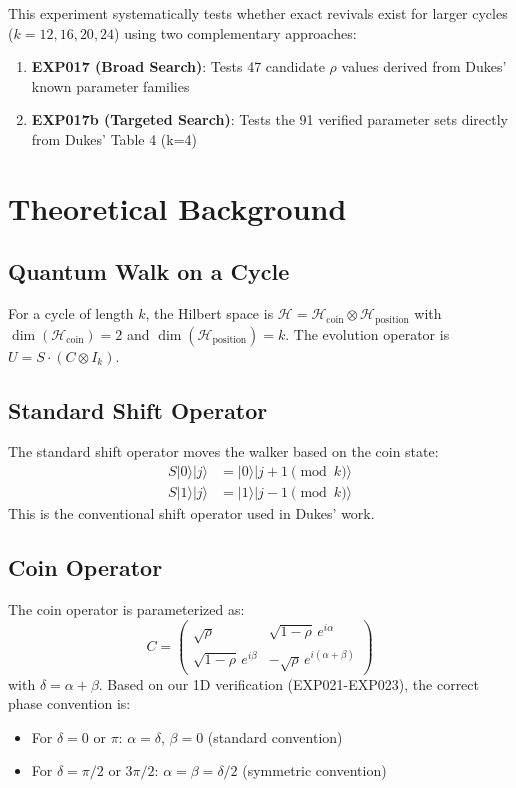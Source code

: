 \documentclass[12pt]{article}
\begin{document}
This experiment systematically tests whether exact revivals exist for larger cycles ($k = 12, 16, 20, 24$) using two complementary approaches:

\begin{enumerate}
    \item \textbf{EXP017 (Broad Search)}: Tests 47 candidate $\rho$ values derived from Dukes' known parameter families
    \item \textbf{EXP017b (Targeted Search)}: Tests the 91 verified parameter sets directly from Dukes' Table 4 (k=4)
\end{enumerate}

\section{Theoretical Background}

\subsection{Quantum Walk on a Cycle}

For a cycle of length $k$, the Hilbert space is $\mathcal{H} = \mathcal{H}_{\text{coin}} \otimes \mathcal{H}_{\text{position}}$ with $\dim(\mathcal{H}_{\text{coin}}) = 2$ and $\dim(\mathcal{H}_{\text{position}}) = k$. The evolution operator is $U = S \cdot (C \otimes I_k)$.

\subsection{Standard Shift Operator}

The standard shift operator moves the walker based on the coin state:
\begin{align}
S|0\rangle|j\rangle &= |0\rangle|j+1 \pmod k\rangle \\
S|1\rangle|j\rangle &= |1\rangle|j-1 \pmod k\rangle
\end{align}
This is the conventional shift operator used in Dukes' work.

\subsection{Coin Operator}

The coin operator is parameterized as:
\[
C = \begin{pmatrix}
\sqrt{\rho} & \sqrt{1-\rho}\, e^{i\alpha} \\
\sqrt{1-\rho}\, e^{i\beta} & -\sqrt{\rho}\, e^{i(\alpha+\beta)}
\end{pmatrix}
\]
with $\delta = \alpha + \beta$. Based on our 1D verification (EXP021-EXP023), the correct phase convention is:
\begin{itemize}
    \item For $\delta = 0$ or $\pi$: $\alpha = \delta$, $\beta = 0$ (standard convention)
    \item For $\delta = \pi/2$ or $3\pi/2$: $\alpha = \beta = \delta/2$ (symmetric convention)
\end{itemize}
\end{document}
